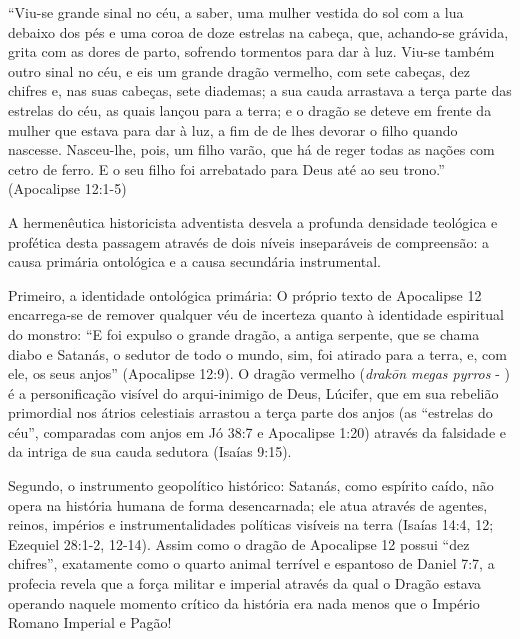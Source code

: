 \documentclass[11pt,a4paper,openany]{book}
\begin{document}
``Viu-se grande sinal no céu, a saber, uma mulher vestida do sol com a lua debaixo dos pés e uma coroa de doze estrelas na cabeça, que, achando-se grávida, grita com as dores de parto, sofrendo tormentos para dar à luz. Viu-se também outro sinal no céu, e eis um grande dragão vermelho, com sete cabeças, dez chifres e, nas suas cabeças, sete diademas; a sua cauda arrastava a terça parte das estrelas do céu, as quais lançou para a terra; e o dragão se deteve em frente da mulher que estava para dar à luz, a fim de de lhes devorar o filho quando nascesse. Nasceu-lhe, pois, um filho varão, que há de reger todas as nações com cetro de ferro. E o seu filho foi arrebatado para Deus até ao seu trono.'' (Apocalipse 12:1-5)

A hermenêutica historicista adventista desvela a profunda densidade teológica e profética desta passagem através de dois níveis inseparáveis de compreensão: a causa primária ontológica e a causa secundária instrumental.

Primeiro, a identidade ontológica primária:
O próprio texto de Apocalipse 12 encarrega-se de remover qualquer véu de incerteza quanto à identidade espiritual do monstro: ``E foi expulso o grande dragão, a antiga serpente, que se chama diabo e Satanás, o sedutor de todo o mundo, sim, foi atirado para a terra, e, com ele, os seus anjos'' (Apocalipse 12:9). O dragão vermelho (\textit{drakōn megas pyrros} - ) é a personificação visível do arqui-inimigo de Deus, Lúcifer, que em sua rebelião primordial nos átrios celestiais arrastou a terça parte dos anjos (as ``estrelas do céu'', comparadas com anjos em Jó 38:7 e Apocalipse 1:20) através da falsidade e da intriga de sua cauda sedutora (Isaías 9:15).

Segundo, o instrumento geopolítico histórico:
Satanás, como espírito caído, não opera na história humana de forma desencarnada; ele atua através de agentes, reinos, impérios e instrumentalidades políticas visíveis na terra (Isaías 14:4, 12; Ezequiel 28:1-2, 12-14).
Assim como o dragão de Apocalipse 12 possui ``dez chifres'', exatamente como o quarto animal terrível e espantoso de Daniel 7:7, a profecia revela que a força militar e imperial através da qual o Dragão estava operando naquele momento crítico da história era nada menos que o Império Romano Imperial e Pagão!
\end{document}
